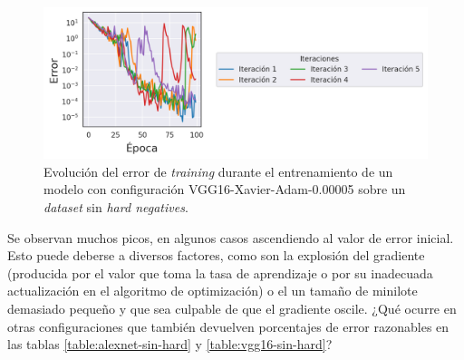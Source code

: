 \begin{figure}[H]
\centering
    \includegraphics[scale=0.67]{imagenes/image_classification/original_dataset/loss_vgg16_xavier_adam_00005.png}
    \caption{Evolución del error de \textit{training} durante el entrenamiento de un modelo con configuración VGG16-Xavier-Adam-0.00005 sobre un \textit{dataset} sin \textit{hard negatives}.}
\end{figure}

Se observan muchos picos, en algunos casos ascendiendo al valor de error inicial. Esto puede deberse a diversos factores, como son la explosión del gradiente (producida por el valor que toma la tasa de aprendizaje o por su inadecuada actualización en el algoritmo de optimización) o el un tamaño de minilote demasiado pequeño y que sea culpable de que el gradiente oscile. ¿Qué ocurre en otras configuraciones que también devuelven porcentajes de error razonables en las tablas \ref{table:alexnet-sin-hard} y \ref{table:vgg16-sin-hard}?

